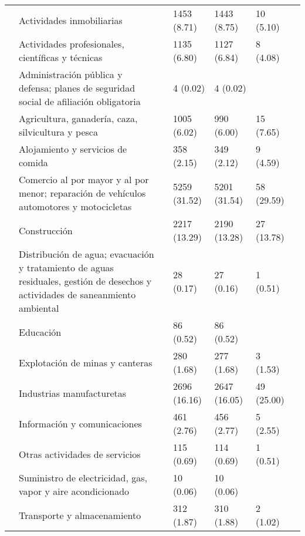 \begin{tabular}{lllllll}
{{ & Actividades inmobiliarias &  & 1453 (8.71) & 1443 (8.75) & 10 (5.10) &  \\
 & Actividades profesionales,  científicas y técnicas &  & 1135 (6.80) & 1127 (6.84) & 8 (4.08) &  \\
 & Administración pública y defensa; planes de seguridad social de afiliación obligatoria &  & 4 (0.02) & 4 (0.02) &  &  \\
 & Agricultura, ganadería, caza, silvicultura y pesca &  & 1005 (6.02) & 990 (6.00) & 15 (7.65) &  \\
 & Alojamiento y servicios de comida &  & 358 (2.15) & 349 (2.12) & 9 (4.59) &  \\
 & Comercio al por mayor y al por menor; reparación de vehículos automotores y motocicletas &  & 5259 (31.52) & 5201 (31.54) & 58 (29.59) &  \\
 & Construcción &  & 2217 (13.29) & 2190 (13.28) & 27 (13.78) &  \\
 & Distribución de agua; evacuación y tratamiento de aguas residuales, gestión de desechos y actividades de saneanmiento ambiental &  & 28 (0.17) & 27 (0.16) & 1 (0.51) &  \\
 & Educación &  & 86 (0.52) & 86 (0.52) &  &  \\
 & Explotación de minas y canteras &  & 280 (1.68) & 277 (1.68) & 3 (1.53) &  \\
 & Industrias manufacturetas &  & 2696 (16.16) & 2647 (16.05) & 49 (25.00) &  \\
 & Información y comunicaciones &  & 461 (2.76) & 456 (2.77) & 5 (2.55) &  \\
 & Otras actividades de servicios &  & 115 (0.69) & 114 (0.69) & 1 (0.51) &  \\
 & Suministro de electricidad, gas, vapor y aire acondicionado &  & 10 (0.06) & 10 (0.06) &  &  \\
 & Transporte y almacenamiento &  & 312 (1.87) & 310 (1.88) & 2 (1.02) &  \\
\cline{1-7}
\bottomrule
\end{tabular}
